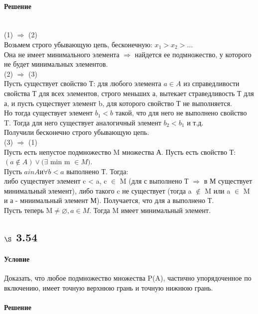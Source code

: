\documentclass[a4paper,12pt]{article}
\begin{document}
\paragraph*{Решение}\mbox{}\\
(1) $\Rightarrow$ (2)\\
Возьмем строго убывающую цепь, бесконечную: $x_1 > x_2 > ...$\\
Она не имеет минимального элемента $\Rightarrow$ найдется ее подмножество, у которого не будет минимальных элементов.\\
(2) $\Rightarrow$ (3)\\
Пусть существует свойство Т: для любого элемента $a \in A$ из справедливости свойства Т для всех элементов, строго меньших а, вытекает страведливость Т для а, и пусть существует элемент b, для которого свойство Т не выполняется.\\
Но тогда существует элемент $b_1 < b$ такой, что для него не выполнено свойство T. Тогда для него существует аналогичный элемент $b_2 < b_1$ и т.д.\\
Получили бесконечно строго убывающую цепь.\\
(3) $\Rightarrow$ (1)\\
Пусть есть непустое подмножество M множества А. Пусть есть свойство Т: $ (a \notin A) \vee (\exists$  min  m $\in M )$.\\
Пусть $a in A и \forall b < a $  выполнено Т. Тогда:\\
либо существует элемент c < a, c $\in$ M (для с выполнено Т $\Rightarrow$ в М существует минимальный элемент),  либо такого c не существует (тогда a $\notin$ M или a $\in$ M и а - мниимальный элемент М). Получается, что для а выполнено Т.\\
Пусть теперь M$\neq \varnothing, a \in M$. Тогда M имеет минимальный элемент.

\subsection*{$\S$ 3.54}
\paragraph*{Условие} Доказать, что любое подмножество множества P(A), частично упорядоченное по включению, имеет точную верхнюю грань и точную нижнюю грань.
\paragraph*{Решение}
\end{document}

